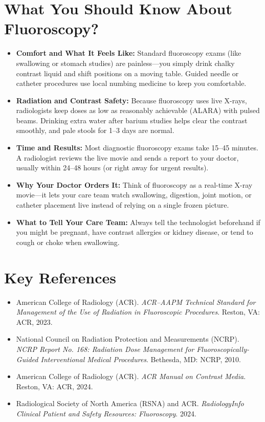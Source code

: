 \section{What You Should Know About Fluoroscopy?}

\begin{itemize}
    \item \textbf{Comfort and What It Feels Like:} Standard fluoroscopy exams (like swallowing or stomach studies) are painless---you simply drink chalky contrast liquid and shift positions on a moving table. Guided needle or catheter procedures use local numbing medicine to keep you comfortable.
    \item \textbf{Radiation and Contrast Safety:} Because fluoroscopy uses live X-rays, radiologists keep doses as low as reasonably achievable (ALARA) with pulsed beams. Drinking extra water after barium studies helps clear the contrast smoothly, and pale stools for 1--3 days are normal.
    \item \textbf{Time and Results:} Most diagnostic fluoroscopy exams take 15--45 minutes. A radiologist reviews the live movie and sends a report to your doctor, usually within 24--48 hours (or right away for urgent results).
    \item \textbf{Why Your Doctor Orders It:} Think of fluoroscopy as a real-time X-ray movie---it lets your care team watch swallowing, digestion, joint motion, or catheter placement live instead of relying on a single frozen picture.
    \item \textbf{What to Tell Your Care Team:} Always tell the technologist beforehand if you might be pregnant, have contrast allergies or kidney disease, or tend to cough or choke when swallowing.
\end{itemize}

\section{Key References}

\begin{itemize}
    \item American College of Radiology (ACR). \textit{ACR--AAPM Technical Standard for Management of the Use of Radiation in Fluoroscopic Procedures}. Reston, VA: ACR, 2023.
    \item National Council on Radiation Protection and Measurements (NCRP). \textit{NCRP Report No. 168: Radiation Dose Management for Fluoroscopically-Guided Interventional Medical Procedures}. Bethesda, MD: NCRP, 2010.
    \item American College of Radiology (ACR). \textit{ACR Manual on Contrast Media}. Reston, VA: ACR, 2024.
    \item Radiological Society of North America (RSNA) and ACR. \textit{RadiologyInfo Clinical Patient and Safety Resources: Fluoroscopy}. 2024.
\end{itemize}

